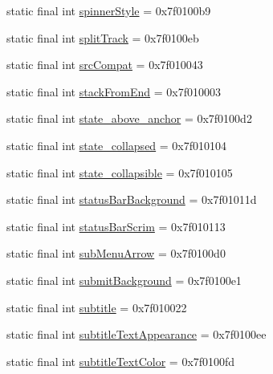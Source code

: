 \begin{CompactItemize}
\item 
static final int \hyperlink{classandroid_1_1support_1_1v4_1_1_r_1_1attr_3946ae03a59398d8b40f12b6f026ba08}{spinnerStyle} = 0x7f0100b9
\item 
static final int \hyperlink{classandroid_1_1support_1_1v4_1_1_r_1_1attr_e7ed41fb9693b634c8f8ecea96422be9}{splitTrack} = 0x7f0100eb
\item 
static final int \hyperlink{classandroid_1_1support_1_1v4_1_1_r_1_1attr_0cddd589223fbbb1f9a4d2c59c2713c8}{srcCompat} = 0x7f010043
\item 
static final int \hyperlink{classandroid_1_1support_1_1v4_1_1_r_1_1attr_e6e8293781b82279a7842ba84ffb8148}{stackFromEnd} = 0x7f010003
\item 
static final int \hyperlink{classandroid_1_1support_1_1v4_1_1_r_1_1attr_cd0919d4a89dad9dc9c9f35f0c5b8d00}{state\_\-above\_\-anchor} = 0x7f0100d2
\item 
static final int \hyperlink{classandroid_1_1support_1_1v4_1_1_r_1_1attr_488ebee3ccb8eb35508fe0cc605c9d56}{state\_\-collapsed} = 0x7f010104
\item 
static final int \hyperlink{classandroid_1_1support_1_1v4_1_1_r_1_1attr_b18ddec4dafc95ead6c43b00dfbb0ad0}{state\_\-collapsible} = 0x7f010105
\item 
static final int \hyperlink{classandroid_1_1support_1_1v4_1_1_r_1_1attr_5af8973523518de6dd9b1de7e0c62640}{statusBarBackground} = 0x7f01011d
\item 
static final int \hyperlink{classandroid_1_1support_1_1v4_1_1_r_1_1attr_5657e1db89fbe4f4ac02ab9e86e1d735}{statusBarScrim} = 0x7f010113
\item 
static final int \hyperlink{classandroid_1_1support_1_1v4_1_1_r_1_1attr_37aa7f8a3cedd33edaa0e1ae07599d2d}{subMenuArrow} = 0x7f0100d0
\item 
static final int \hyperlink{classandroid_1_1support_1_1v4_1_1_r_1_1attr_25e10fc0bae06e451130eeeafd42b1af}{submitBackground} = 0x7f0100e1
\item 
static final int \hyperlink{classandroid_1_1support_1_1v4_1_1_r_1_1attr_f086325a5b74dd3d871ce41c6c9f0fd0}{subtitle} = 0x7f010022
\item 
static final int \hyperlink{classandroid_1_1support_1_1v4_1_1_r_1_1attr_f56bffec2edff659bd3fb2891171b699}{subtitleTextAppearance} = 0x7f0100ee
\item 
static final int \hyperlink{classandroid_1_1support_1_1v4_1_1_r_1_1attr_d135e375c8352d4b24a2ede9ccfedc33}{subtitleTextColor} = 0x7f0100fd
\item 

\end{CompactItemize}
